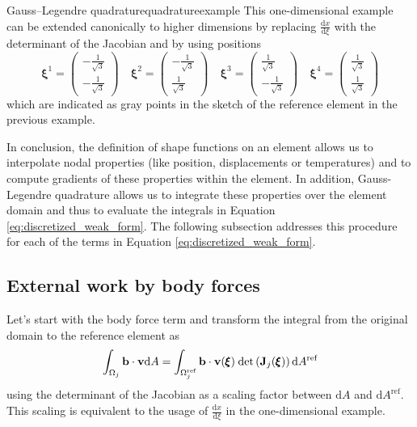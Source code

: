 \begin{example}{Gauss–Legendre quadrature}{quadratureexample}
    This one-dimensional example can be extended canonically to higher dimensions by replacing $\frac{\text{d}x}{\text{d}\xi}$ with the determinant of the Jacobian and by using positions 
    \begin{equation}
        \pmb{\xi}^1 = \begin{pmatrix}-\frac{1}{\sqrt{3}} \\ -\frac{1}{\sqrt{3}}\end{pmatrix} 
        \quad
        \pmb{\xi}^2 = \begin{pmatrix}-\frac{1}{\sqrt{3}} \\ \frac{1}{\sqrt{3}}\end{pmatrix} 
        \quad
        \pmb{\xi}^3 = \begin{pmatrix}\frac{1}{\sqrt{3}} \\ -\frac{1}{\sqrt{3}}\end{pmatrix} 
        \quad
        \pmb{\xi}^4 = \begin{pmatrix}\frac{1}{\sqrt{3}} \\ \frac{1}{\sqrt{3}}\end{pmatrix} 
        \label{eq:gaussian_weights}
    \end{equation}
    which are indicated as gray points in the sketch of the reference element in the previous example.
\end{example}

In conclusion, the definition of shape functions on an element allows us to interpolate nodal properties (like position, displacements or temperatures) and to compute gradients of these properties within the element. In addition, Gauss-Legendre quadrature allows us to integrate these properties over the element domain and thus to evaluate the integrals in Equation \eqref{eq:discretized_weak_form}. The following subsection addresses this procedure for each of the terms in Equation \eqref{eq:discretized_weak_form}.

\subsection{External work by body forces}
Let's start with the body force term and transform the integral from the original domain to the reference element as
\begin{equation}
    \int_{\Omega_j} \mathbf{b} \cdot \mathbf{v} \text{d}A
    = 
    \int_{\Omega_j^\textrm{ref}} \mathbf{b} \cdot \mathbf{v}(\pmb{\xi})
    \hspace{0.25em} \text{det}\left(\mathbf{J}_j(\pmb{\xi})\right)\text{d}A^\textrm{ref}
\end{equation}
using the determinant of the Jacobian as a scaling factor between $\text{d}A$ and $\text{d}A^\textrm{ref}$. This scaling is equivalent to the usage of $\frac{\text{d}x}{\text{d}\xi}$ in the one-dimensional example. 

